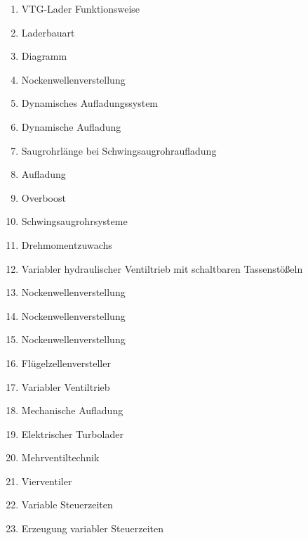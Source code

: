 \begin{enumerate}
\item
  VTG-Lader Funktionsweise\\
\item
  Laderbauart\\
\item
  Diagramm\\
\item
  Nockenwellenverstellung\\
\item
  Dynamisches Aufladungssystem\\
\item
  Dynamische Aufladung\\
\item
  Saugrohrlänge bei Schwingsaugrohraufladung\\
\item
  Aufladung\\
\item
  Overboost\\
\item
  Schwingsaugrohrsysteme\\
\item
  Drehmomentzuwachs\\
\item
  Variabler hydraulischer Ventiltrieb mit schaltbaren Tassenstößeln\\
\item
  Nockenwellenverstellung\\
\item
  Nockenwellenverstellung\\
\item
  Nockenwellenverstellung\\
\item
  Flügelzellenversteller\\
\item
  Variabler Ventiltrieb\\
\item
  Mechanische Aufladung\\
\item
  Elektrischer Turbolader\\
\item
  Mehrventiltechnik\\
\item
  Vierventiler\\
\item
  Variable Steuerzeiten\\
\item
  Erzeugung variabler Steuerzeiten\\

\end{enumerate}

